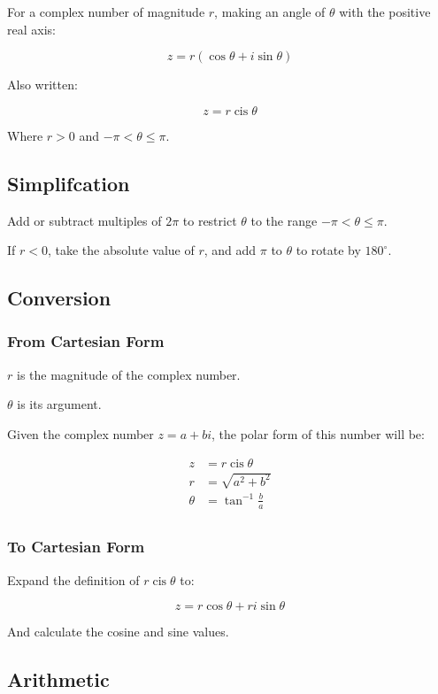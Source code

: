 \documentclass[a4paper,11pt]{article}
\DeclareMathOperator\cis{cis}
\begin{document}
For a complex number of magnitude $r$, making an angle of $\theta$ with the
positive real axis:

$$
z = r (\cos{\theta} + i\sin{\theta})
$$

Also written:

$$
z = r \cis{\theta}
$$

Where $r > 0$ and $-\pi < \theta \leq \pi$.


\subsection{Simplifcation}

Add or subtract multiples of $2\pi$ to restrict $\theta$ to the range
$-\pi < \theta \leq \pi$.

If $r < 0$, take the absolute value of $r$, and add $\pi$ to $\theta$ to rotate
by $180^\circ$.


\subsection{Conversion}

\subsubsection{From Cartesian Form}

$r$ is the magnitude of the complex number.

$\theta$ is its argument.

Given the complex number $z = a + bi$, the polar form of this number will be:

$$
\begin{aligned}
z & = r \cis{\theta} \\
r & = \sqrt{a^2 + b^2} \\
\theta & = \tan^{-1}{\frac{b}{a}} \\
\end{aligned}
$$


\subsubsection{To Cartesian Form}

Expand the definition of $r \cis{\theta}$ to:

$$
z = r \cos{\theta} + ri\sin{\theta}
$$

And calculate the cosine and sine values.


\subsection{Arithmetic}
\end{document}
